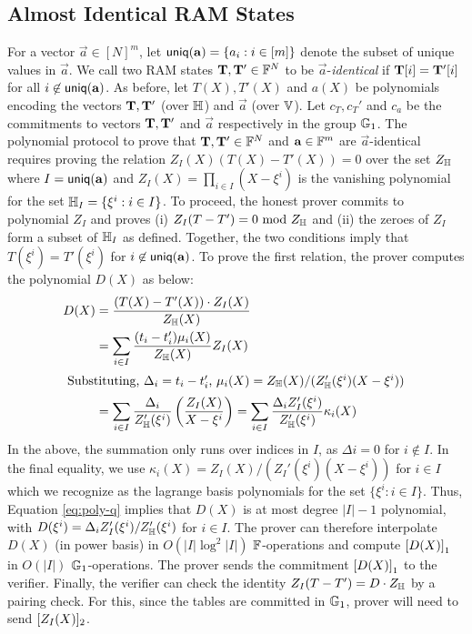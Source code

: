 \subsection{Almost Identical RAM States}\label{subsec:proximity-ram}
For a vector $\vec{a}\in [N]^m$, let $\mathsf{uniq}(\mathbf{{a}})=\{a_i: i\in [m]\}$ denote the subset of unique values in $\vec{a}$. We call two
RAM states $\mathbf{T}, \mathbf{T}'\in \mathbb{F}^N$ to be $\vec{a}$-{\em identical} if $\mathbf{T}[i]=\mathbf{T}'[i]$ for all $i\not\in\mathsf{uniq}(\mathbf{{a}})$. As before,
let $T(X),T'(X)$ and $a(X)$ be polynomials encoding the vectors $\mathbf{T},\mathbf{T}'$ (over $\mathbb{H}$) and $\vec{a}$ (over $\mathbb{V}$). Let
$c_T, c_T'$ and $c_a$ be the commitments to vectors $\mathbf{T}, \mathbf{T}'$ and $\vec{a}$ respectively in the group $\mathbb{G}_1$. The polynomial protocol to prove that
$\mathbf{T},\mathbf{T}'\in \mathbb{F}^N$ and $\mathbf{a}\in \mathbb{F}^m$ are $\vec{a}$-identical requires proving the relation
$Z_I(X)(T(X) - T'(X)) = 0$ over the set $Z_{\mathbb{H}}$ where
$I=\mathsf{uniq}(\mathbf{{a}})$ and $Z_I(X)=\prod_{i\in I}(X-\xi^i)$ is the vanishing polynomial for the set $\mathbb{H}_I=\{\xi^i: i\in I\}$.
To proceed, the honest prover commits to polynomial $Z_I$ and proves (i) $Z_I(T - T') = 0 \text{ mod } Z_{\mathbb{H}}$ and (ii) the zeroes
of $Z_I$ form a subset of $\mathbb{H}_I$ as defined. Together, the two conditions imply that $T(\xi^i)=T'(\xi^i)$ for $i\not\in \mathsf{uniq}(\mathbf{{a}})$.
To prove the first relation, the prover computes the polynomial $D(X)$ as below:
\begin{align}\label{eq:poly-q}
D(X) &= \frac{(T(X)-T'(X))\cdot Z_I(X)}{Z_{\mathbb{H}}(X)} \nonumber \\
&= \sum_{i\in I}\frac{(t_i - t_i')\mu_i(X)}{Z_{\mathbb{H}}(X)} Z_I(X) \nonumber \\
\intertext{ Substituting, $\Delta_i=t_i-t_i'$, $\mu_i(X)=Z_\mathbb{H}(X)/(Z_\mathbb{H}'(\xi^i)(X-\xi^i))$ }
&=\sum_{i\in I}\frac{\Delta_i}{Z_{\mathbb{H}}'(\xi^i)}\left(\frac{Z_I(X)}{X-\xi^i}\right) = \sum_{i\in I}\frac{\Delta_i Z_I'(\xi^i)}{Z_{\mathbb{H}}'(\xi^i)}\kappa_i(X)
\end{align}
In the above, the summation only runs over indices in $I$, as $\Delta i = 0$ for $i\not\in I$. In the final equality, we use
$\kappa_i(X) = Z_I(X)/(Z_I'(\xi^i)(X-\xi^i))$ for $i\in I$ which we recognize as the lagrange basis polynomials for the set
$\{\xi^i: i\in I\}$. Thus, Equation \eqref{eq:poly-q} implies that $D(X)$ is at most degree $|I|-1$ polynomial, with
$D(\xi^i)=\Delta_i Z_I'(\xi^i)/Z_\mathbb{H}'(\xi^i)$ for $i\in I$.
The prover can therefore interpolate $D(X)$ (in power basis)
in $O(|I|\log^2 |I|)$ $\mathbb{F}$-operations and compute $\left[{D(X)}\right]_1$ in $O(|I|)$ $\mathbb{G}_1$-operations. The prover sends the
commitment $\left[{D(X)}\right]_1$ to the verifier. Finally, the verifier can
check the identity $Z_I(T - T') = D\cdot Z_{\mathbb{H}}$ by a pairing check. For this, since the tables are committed in $\mathbb{G}_1$, prover will need to send $[Z_I(X)]_2$.

